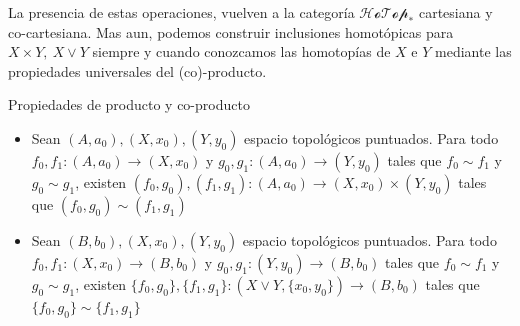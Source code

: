 La presencia de estas operaciones, vuelven a la categoría
\(\mathscr{HoTop}_*\) cartesiana y co-cartesiana. Mas aun, podemos
construir inclusiones homotópicas para \(X \times Y,\ X \vee Y\)
siempre y cuando conozcamos las homotopías de \(X\) e \(Y\) mediante
las propiedades universales del (co)-producto.

\begin{teorema} \label{thm:prop-prod}
  Propiedades de producto y co-producto
  \begin{itemize}
    \item Sean \((A,a_0), (X,x_0), (Y,y_0)\) espacio topológicos
      puntuados. Para todo \(f_0, f_1 : (A,a_0) \to (X,x_0)\) y \(g_0,
      g_1 : (A, a_0) \to (Y,y_0)\) tales que \(f_0 \sim f_1 \) y \(g_0
      \sim g_1 \), existen \( (f_0, g_0), (f_1, g_1) : (A,a_0) \to (X,x_0)
      \times (Y,y_0)\) tales que \((f_0 , g_0) \sim (f_1 , g_1) \)
    \item Sean \((B,b_0), (X,x_0), (Y,y_0)\) espacio topológicos
      puntuados. Para todo \(f_0, f_1 : (X,x_0) \to (B,b_0) \) y \(g_0,
      g_1 : (Y, y_0) \to (B,b_0)\) tales que \(f_0 \sim f_1 \) y \(g_0
      \sim g_1 \), existen \( \{f_0, g_0\}, \{f_1, g_1\} : (X \vee
      Y,\{x_0,y_0\}) \to (B,b_0) \) tales que \(\{f_0 , g_0\} \sim \{f_1 ,
      g_1\} \)
  \end{itemize}
\end{teorema}
